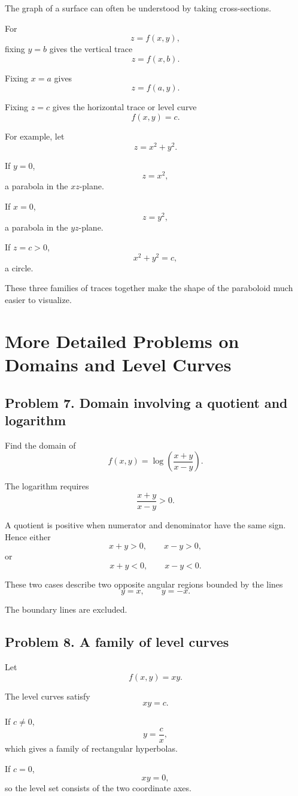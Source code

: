 \documentclass[11pt,oneside]{book}
\theoremstyle{studentthm}
\theoremstyle{definition}
\begin{document}
The graph of a surface can often be understood by taking cross-sections.

For
\[
z=f(x,y),
\]
fixing \(y=b\) gives the vertical trace
\[
z=f(x,b).
\]

Fixing \(x=a\) gives
\[
z=f(a,y).
\]

Fixing \(z=c\) gives the horizontal trace or level curve
\[
f(x,y)=c.
\]

For example, let
\[
z=x^2+y^2.
\]

If \(y=0\),
\[
z=x^2,
\]
a parabola in the \(xz\)-plane.

If \(x=0\),
\[
z=y^2,
\]
a parabola in the \(yz\)-plane.

If \(z=c>0\),
\[
x^2+y^2=c,
\]
a circle.

These three families of traces together make the shape of the
paraboloid much easier to visualize.

\section{More Detailed Problems on Domains and Level Curves}

\subsection*{Problem 7. Domain involving a quotient and logarithm}

Find the domain of
\[
f(x,y)
=
\log\left(\frac{x+y}{x-y}\right).
\]

The logarithm requires
\[
\frac{x+y}{x-y}>0.
\]

A quotient is positive when numerator and denominator have the same
sign. Hence either
\[
x+y>0,\qquad x-y>0,
\]
or
\[
x+y<0,\qquad x-y<0.
\]

These two cases describe two opposite angular regions bounded by the
lines
\[
y=x,\qquad y=-x.
\]

The boundary lines are excluded.

\subsection*{Problem 8. A family of level curves}

Let
\[
f(x,y)=xy.
\]

The level curves satisfy
\[
xy=c.
\]

If \(c\ne0\),
\[
y=\frac{c}{x},
\]
which gives a family of rectangular hyperbolas.

If \(c=0\),
\[
xy=0,
\]
so the level set consists of the two coordinate axes.
\end{document}
